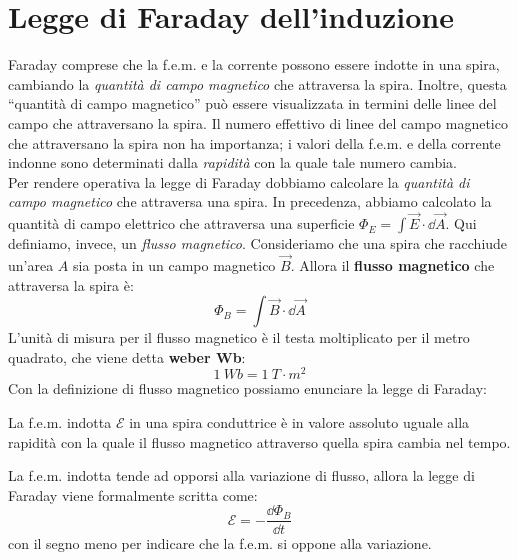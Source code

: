 \documentclass[12pt]{report}
\begin{document}
\section{Legge di Faraday dell'induzione}
	Faraday comprese che la f.e.m. e la corrente possono essere indotte in una spira, cambiando la \textit{quantità di campo magnetico} che attraversa la spira. Inoltre, questa ``quantità di campo magnetico'' può essere visualizzata in termini delle linee del campo che attraversano la spira. Il numero effettivo di linee del campo magnetico che attraversano la spira non ha importanza; i valori della f.e.m. e della corrente indonne sono determinati dalla \textit{rapidità} con la quale tale numero cambia. \\
	Per rendere operativa la legge di Faraday dobbiamo calcolare la \textit{quantità di campo magnetico} che attraversa una spira. In precedenza, abbiamo calcolato la quantità di campo elettrico che attraversa una superficie $\Phi_E = \int \vec{E} \cdot \dd\vec{A}$. Qui definiamo, invece, un \textit{flusso magnetico}. Consideriamo che una spira che racchiude un'area $A$ sia posta in un campo magnetico $\vec{B}$. Allora il \textbf{flusso magnetico} che attraversa la spira è:
	\[
		\Phi_B = \int \vec{B} \cdot \dd\vec{A}
	\]
	L'unità di misura per il flusso magnetico è il testa moltiplicato per il metro quadrato, che viene detta \textbf{weber Wb}:
	\[
	1\ Wb = 1\ T \cdot m^2
	\]
	Con la definizione di flusso magnetico possiamo enunciare la legge di Faraday:
	\begin{center}
		La f.e.m. indotta $\mathcal{E}$ in una spira conduttrice è in valore assoluto uguale alla rapidità con la quale il flusso magnetico attraverso quella spira cambia nel tempo.
	\end{center}
	La f.e.m. indotta tende ad opporsi alla variazione di flusso, allora la legge di Faraday viene formalmente scritta come:
	\[
	\mathcal{E} = -\frac{\dd\Phi_B}{\dd t}
	\]
	con il segno meno per indicare che la f.e.m. si oppone alla variazione.
\end{document}
